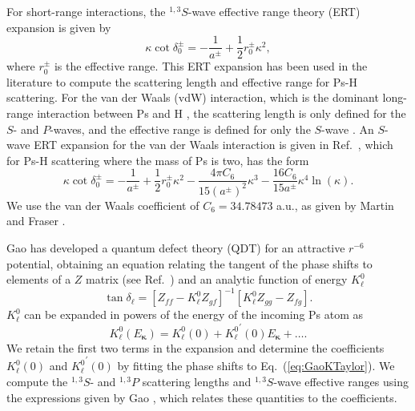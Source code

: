 \documentclass[preprint,showpacs,showkeys,preprintnumbers,amsmath,amssymb,longbibliography,pra,aps]{revtex4-1}
\begin{document}
For short-range interactions, the $^{1,3}S$-wave effective range theory (ERT)
expansion is given by \cite{Bethe1949,Blatt1949}
\begin{equation}
\label{eq:EffectiveRangeShort}
\kappa \cot\delta_0^\pm = -\frac{1}{a^\pm} + \frac{1}{2} r_0^\pm \kappa^2,
\end{equation}
where $r_0^\pm$ is the effective range.
This ERT expansion has been used in the literature
\cite{Ivanov2002,VanReeth2003,Blackwood2002,Walters2004} to compute the
scattering length and effective range for Ps-H scattering. 
For the van der Waals (vdW) interaction, which is the dominant long-range
interaction between Ps and H \cite{Fabrikant2014,VanReeth2003,Au1986},
the scattering length is only defined for the $S$- and $P$-waves, and the 
effective range is defined for only the $S$-wave \cite{Levy1963}.
An $S$-wave ERT expansion for the van der Waals interaction is given in
Ref.~\cite{Drake2006}, which for Ps-H scattering where the mass of Ps
is two, has the form
\begin{equation}
\label{eq:EffectiveRangeLongAu}
\kappa \cot\delta_0^\pm = -\frac{1}{a^\pm} + \frac{1}{2} r_0^\pm \kappa^2 - 
  \frac{4 \pi C_6}{15 (a^\pm)^2} \kappa^3 - 
  \frac{16 C_6}{15 a^\pm} \kappa^4 \ln \left(\kappa \right).
\end{equation}
We use the van der Waals coefficient of $C_6 = 34.78473$ a.u., as given
by Martin and Fraser \cite{Martin1980}.

Gao \cite{Gao1998} has developed a quantum defect theory (QDT)
for an attractive $r^{-6}$ potential, obtaining an equation relating
the tangent of the phase shifts to elements of a $Z$ matrix
(see Ref.~\cite{Gao1998}) and an analytic function of energy $K_\ell^0$
\cite{Gao1998a}
\begin{equation}
\label{eq:GaoZEqn}
\tan\delta_\ell = [Z_{ff} - K_\ell^0 Z_{gf}]^{-1}
  [K_\ell^0 Z_{gg} - Z_{fg}].
\end{equation}
$K_\ell^0$ can be expanded in powers of the energy \cite{Gao1998a} of the
incoming Ps atom as
\begin{equation}
\label{eq:GaoKTaylor}
K_\ell^0(E_{\bm \kappa}) = K_\ell^0(0) + {K_\ell^0}^\prime(0) E_{\bm \kappa}
  + \ldots.
\end{equation}
We retain the first two terms in the expansion and determine the coefficients
$K_\ell^0(0)$ and ${K_\ell^0}^\prime(0)$ by fitting the phase shifts to
Eq.~(\ref{eq:GaoKTaylor}). We compute the $^{1,3}S$- and $^{1,3}P$ scattering
lengths and $^{1,3}S$-wave effective ranges using the expressions
given by Gao \cite{Gao1998a}, which relates these quantities to the
coefficients.
\end{document}
